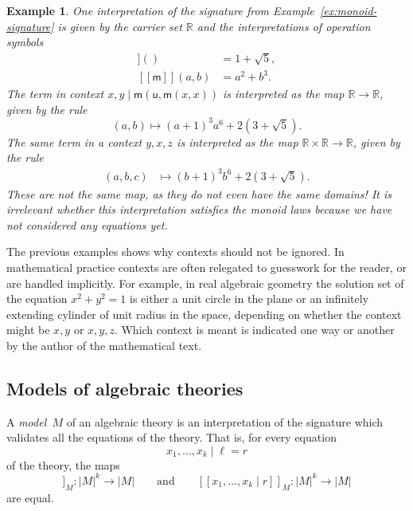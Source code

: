 \documentclass{amsart}
\newcommand{\RR}{\mathbb{R}}
\newcommand{\sem}[1]{[\![#1]\!]}
\newtheorem{example}[definition]{Example}
\begin{document}
\begin{example}
  One interpretation of the signature from Example~\ref{ex:monoid-signature} is given by
  the carrier set $\RR$ and the interpretations of operation symbols
  \begin{align*}
    \sem{\mathsf{u}}() &= 1 + \sqrt{5}, \\
    \sem{\mathsf{m}}(a, b) &= a^2 + b^3.
  \end{align*}
  The term in context $x, y \mid \mathsf{m}(\mathsf{u}, \mathsf{m}(x, x))$ is interpreted
  as the map $\RR \to \RR$, given by the rule
  \begin{equation*}
    (a, b) \mapsto (a+1)^3 a^6 + 2 (3 + \sqrt{5}).
  \end{equation*}
  The same term in a context $y, x, z$ is interpreted as the map $\RR \times \RR \to \RR$,
  given by the rule
  \begin{align*}
    (a, b, c) &\mapsto (b+1)^3 b^6 + 2 (3 + \sqrt{5}).
  \end{align*}
  These are not the same map, as they do not even have the same domains! It is irrelevant
  whether this interpretation satisfies the monoid laws because we have not considered any
  equations yet.
\end{example}

The previous examples shows why contexts should not be ignored. In mathematical practice
contexts are often relegated to guesswork for the reader, or are handled implicitly. For
example, in real algebraic geometry the solution set of the equation $x^2 + y^2 = 1$ is
either a unit circle in the plane or an infinitely extending cylinder of unit radius in
the space, depending on whether the context might be $x, y$ or $x, y, z$. Which context is
meant is indicated one way or another by the author of the mathematical text.

\subsection{Models of algebraic theories}
\label{sec:models-algebr-theor}

A \emph{model~$M$} of an algebraic theory is an interpretation of the signature which
validates all the equations of the theory. That is, for every equation
%
\begin{equation*}
  x_1, \ldots, x_k \mid \ell = r
\end{equation*}
%
of the theory, the maps
%
\begin{equation*}
  \sem{x_1, \ldots, x_k \mid \ell}_M : |M|^k \to |M|
  \qquad\text{and}\qquad
  \sem{x_1, \ldots, x_k \mid r}_M : |M|^k \to |M|
\end{equation*}
%
are equal.
\end{document}
